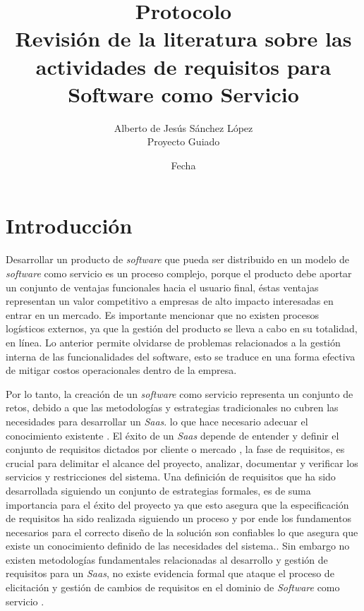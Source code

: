 \documentclass{article}
\begin{document}
  \title{%
  Protocolo \\
  \large Revisión de la literatura sobre las actividades de requisitos para Software como Servicio\\}
  \author{Alberto de Jesús Sánchez López \\ 
  \small Proyecto Guiado}
  \date{Fecha}
  \maketitle
  \thispagestyle{empty}
  \newpage

  \tableofcontents
  \thispagestyle{empty}
  \newpage

\setcounter{page}{1}
\section{Introducción}
Desarrollar un producto de \emph{software} que pueda ser distribuido en un modelo de \emph{software} como servicio 
es un proceso complejo, porque el  producto debe aportar un conjunto de ventajas funcionales hacia el usuario final, 
éstas ventajas representan un valor competitivo a empresas de alto impacto interesadas en entrar en un mercado. Es importante 
mencionar que no existen procesos logísticos externos, ya que la gestión del producto se lleva a cabo en su totalidad, en línea.
Lo anterior permite olvidarse de problemas relacionados a la gestión interna de las funcionalidades del software, 
esto se traduce en una forma efectiva de mitigar costos operacionales dentro de la empresa. 

Por lo tanto, la creación de un \emph{software} como servicio representa un conjunto de retos, debido a que las 
metodologías y estrategias tradicionales no cubren las necesidades para desarrollar un \emph{Saas}. lo que hace necesario adecuar el conocimiento 
existente \cite{wanderley2017requirements}. El éxito de un \emph{Saas} depende de entender y definir el conjunto de requisitos dictados por cliente o mercado \cite{4960886}, 
la fase de requisitos, es crucial para delimitar el alcance del proyecto, analizar, documentar y verificar los servicios y restricciones del sistema. 
Una definición de requisitos que ha sido desarrollada siguiendo un conjunto de estrategias formales,  
es de suma importancia para el éxito del proyecto \cite{6530271} ya que esto asegura que la especificación de requisitos ha sido 
realizada siguiendo un proceso y por ende los fundamentos necesarios para el correcto diseño de la solución son confiables
lo que asegura que existe un conocimiento definido de las necesidades del sistema..
Sin embargo no existen metodologías fundamentales relacionadas al desarrollo y gestión de requisitos para un \emph{Saas}, no existe evidencia 
formal que ataque el proceso de elicitación y gestión de cambios de requisitos en el dominio de \emph{Software} como servicio \cite{7037656}. 
\end{document}
